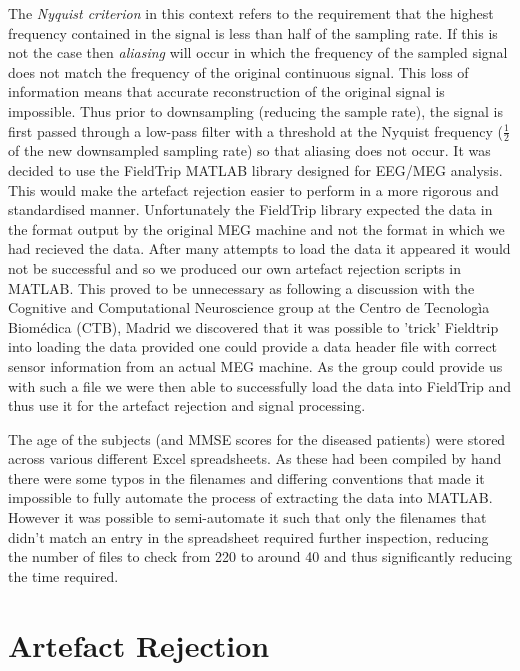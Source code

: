 The \textit{Nyquist criterion} in this context refers to the requirement that the highest frequency contained in the signal is less than half of the sampling rate. If this is not the case then \textit{aliasing} will occur in which the frequency of the sampled signal does not match the frequency of the original continuous signal. This loss of information means that accurate reconstruction of the original signal is impossible. Thus prior to downsampling (reducing the sample rate), the signal is first passed through a low-pass filter with a threshold at the Nyquist frequency ($\frac{1}{2}$ of the new downsampled sampling rate) so that aliasing does not occur. \cite{Smith1999} 
It was decided to use the FieldTrip MATLAB library\cite{Oostenveld2011} designed for EEG/MEG analysis. This would make the artefact rejection easier to perform in a more rigorous and standardised manner. Unfortunately the FieldTrip library expected the data in the format output by the original MEG machine and not the format in which we had recieved the data. After many attempts to load the data it appeared it would not be successful and so we produced our own artefact rejection scripts in MATLAB. This proved to be unnecessary as following a discussion with the Cognitive and Computational Neuroscience group at the Centro de Tecnolog\`{i}a Biom\'{e}dica (CTB), Madrid we discovered that it was possible to 'trick' Fieldtrip into loading the data provided one could provide a data header file with correct sensor information from an actual MEG machine. As the group could provide us with such a file we were then able to successfully load the data into FieldTrip and thus use it for the artefact rejection and signal processing.

The age of the subjects (and MMSE scores for the diseased patients) were stored across various different Excel spreadsheets. As these had been compiled by hand there were some typos in the filenames and differing conventions that made it impossible to fully automate the process of extracting the data into MATLAB. However it was possible to semi-automate it such that only the filenames that didn't match an entry in the spreadsheet required further inspection, reducing the number of files to check from 220 to around 40 and thus significantly reducing the time required.

\section{Artefact Rejection}



